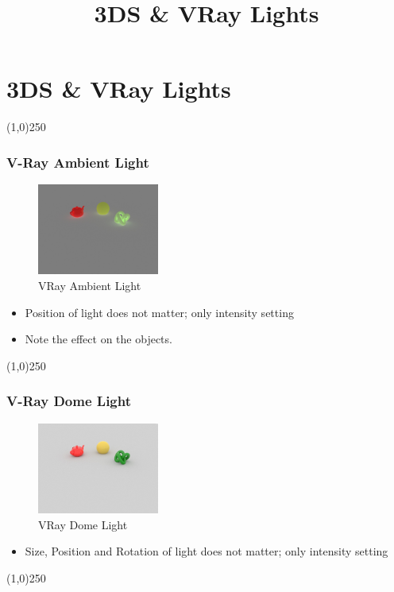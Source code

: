 \section{3DS \& VRay Lights}
\begin{frame}
\title[3DS \& VRay Lights]{3DS \& VRay Lights}
\titlepage
\end{frame}\begin{center}\line(1,0){250}\end{center}


\begin{frame}
	\frametitle{V-Ray Ambient Light}
	\begin{figure}
		\centering
		\includegraphics[height=3cm]{./Lights/Ambient}
		\caption{VRay Ambient Light}
		\label{fig:AmbientLight}
	\end{figure}
	\begin{itemize}
		\item Position of light does not matter; only intensity setting
		\item Note the effect on the objects.
	\end{itemize}
\end{frame}
\begin{center}\line(1,0){250}\end{center}



\begin{frame}
	\frametitle{V-Ray Dome Light}
	\begin{figure}
		\centering
		\includegraphics[height=3cm]{./Lights/DomeLight}
		\caption{VRay Dome Light}
		\label{fig:DomeLight}
	\end{figure}
	\begin{itemize}
		\item Size, Position and Rotation of light does not matter; only intensity setting
	\end{itemize}
\end{frame}
\begin{center}\line(1,0){250}\end{center}





